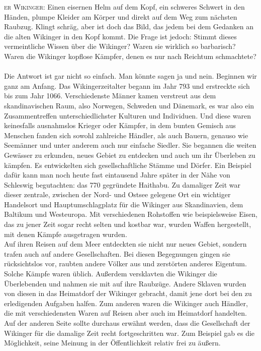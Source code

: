 \documentclass[12pt,a4paper,ngerman]{book}
\newcommand{\flettrine}[2]{\lettrine[lines=2, depth=0, loversize=0.25, nindent=0.69pt, lraise=0.15]{\initfamily{#1}}{#2}}
\newcommand*\initfamily{\usefont{U}{GotIn}{xl}{n}}
\begin{document}
\flettrine{D}{er Wikinger:} Einen eisernen Helm auf dem Kopf, ein schweres Schwert in den Händen, plumpe Kleider am Körper und direkt auf dem Weg zum nächsten Raubzug.
Klingt schräg, aber ist doch das Bild, das jedem bei dem Gedanken an die alten Wikinger in den Kopf kommt. Die Frage ist jedoch: Stimmt dieses vermeintliche Wissen über die Wikinger?
Waren sie wirklich so barbarisch? Waren die Wikinger kopflose Kämpfer, denen es nur nach Reichtum schmachtete?\\\\
Die Antwort ist gar nicht so einfach. Man könnte sagen ja und nein. Beginnen wir ganz am Anfang. Das Wikingerzeitalter begann im Jahr 793 und erstreckte sich bis zum Jahr 1066.
Verschiedenste Männer kamen verstreut aus dem skandinavischen Raum, also Norwegen, Schweden und Dänemark, es war also ein Zusammentreffen unterschiedlichster Kulturen und Individuen.
Und diese waren keinesfalls ausnahmslos Krieger oder Kämpfer, in dem bunten Gemisch aus Menschen fanden sich sowohl zahlreiche Händler, als auch Bauern, genauso wie Seemänner und unter anderem auch nur einfache Siedler.
Sie begannen die weiten Gewässer zu erkunden, neues Gebiet zu entdecken und auch um ihr Überleben zu kämpfen. Es entwickelten sich gesellschaftliche Stämme und Dörfer.
Ein Beispiel dafür kann man noch heute fast eintausend Jahre später in der Nähe von Schleswig begutachten: das 770 gegründete Haithabu. Zu damaliger Zeit war dieser zentrale,
zwischen der Nord- und Ostsee gelegene Ort ein wichtiger Handelsort und Hauptumschlagplatz für die Wikinger aus Skandinavien, dem Baltikum und Westeuropa. Mit verschiedenen Rohstoffen wie beispielsweise Eisen,
das zu jener Zeit sogar recht selten und kostbar war, wurden Waffen hergestellt, mit denen Kämpfe ausgetragen wurden.\\
Auf ihren Reisen auf dem Meer entdeckten sie nicht nur neues Gebiet, sondern trafen auch auf andere Gesellschaften. Bei diesen Begegnungen gingen sie rücksichtslos vor, raubten andere Völker aus und zerstörten anderes Eigentum.
Solche Kämpfe waren üblich. Außerdem versklavten die Wikinger die Überlebenden und nahmen sie mit auf ihre Raubzüge. Andere Sklaven wurden von diesen in das Heimatdorf der Wikinger gebracht, damit jene dort bei den zu erledigenden Aufgaben halfen.
Zum anderen waren die Wikinger auch Händler, die mit verschiedensten Waren auf Reisen aber auch im Heimatdorf handelten.\\
Auf der anderen Seite sollte durchaus erwähnt werden, dass die Gesellschaft der Wikinger für die damalige Zeit recht fortgeschritten war. Zum Beispiel gab es die Möglichkeit, seine Meinung in der Öffentlichkeit relativ frei zu äußern.
\end{document}
